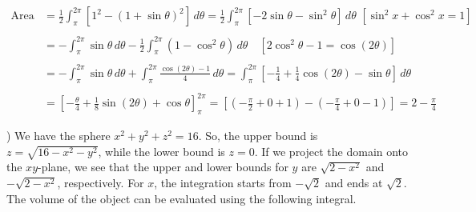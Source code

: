 \documentclass{article}
\begin{document}
\begin{center}
\end{center}

\begin{align*}
\text{Area}&=\frac12\int_\pi^{2\pi}\left[1^2-(1+\sin\theta)^2\right]\,d\theta=\frac12\int_\pi^{2\pi}\left[-2\sin\theta-\sin^2\theta\right]\,d\theta\,\,\left[\sin^2x+\cos^2x=1\right]\\\\&=-\int_\pi^{2\pi}\sin\theta\,d\theta-\frac12\int_\pi^{2\pi}(1-\cos^2\theta)\,d\theta\quad[2\cos^2\theta-1=\cos(2\theta)] \\\\&=-\int_\pi^{2\pi}\sin\theta\,d\theta+\int_\pi^{2\pi}\frac{\cos(2\theta)-1}{4}\,d\theta=\int_\pi^{2\pi}\left[-\frac14+\frac14\cos(2\theta)-\sin\theta\right]\,d\theta\\\\&=\left[-\frac\theta4+\frac18\sin(2\theta)+\cos\theta\right]_{\pi}^{2\pi}=\left[\left(-\frac{\pi}2+0+1\right)-\left(-\frac{\pi}4+0-1\right)\right]={\boxed{2-\frac{\pi}4}}
\end{align*}

\hfill

) We have the sphere $x^2+y^2+z^2=16$. So, the upper bound is $z=\sqrt{16-x^2-y^2}$, while the lower bound is $z=0$. If we project the domain onto the $xy$-plane, we see that the upper and lower bounds for $y$ are $\sqrt{2-x^2}$ and $-\sqrt{2-x^2}$, respectively. For $x$, the integration starts from $-\sqrt2$ and ends at $\sqrt2$. The volume of the object can be evaluated using the following integral.
\end{document}
